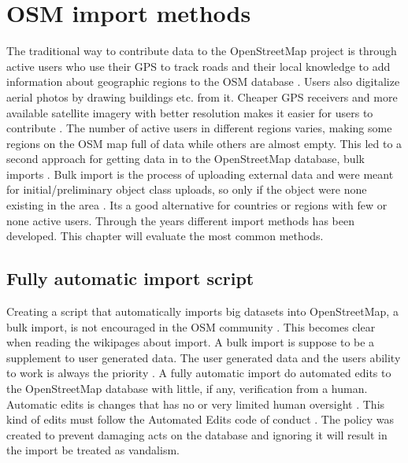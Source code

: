  \chapter{OSM import methods}\label{ch:importmethods}

The traditional way to contribute data to the OpenStreetMap project is through active users who use their GPS to track roads and their local knowledge to add information about geographic regions to the OSM database \cite{Zielstra2013}. Users also digitalize aerial photos by drawing buildings etc. from it. Cheaper GPS receivers and more available satellite imagery with better resolution makes it easier for users to contribute \cite{Chilton}. The number of active users in different regions varies, making some regions on the OSM map full of data while others are almost empty. This led to a second approach for getting data in to the OpenStreetMap database, bulk imports \cite{Zielstra2013}.  Bulk import is the process of uploading external data and were meant for initial/preliminary object class uploads, so only if the object were none existing in the area  \cite{Zielstra2013}.  Its a good alternative for countries or regions with few or none active users. Through the years different import methods has been developed. This chapter will evaluate the most common methods. 

\section{Fully automatic import script}
Creating a script that automatically imports big datasets into OpenStreetMap, a bulk import, is not encouraged in the OSM community \cite{Zielstra2013}. This becomes clear when reading the wikipages about import. A bulk import is suppose to be a supplement to user generated data. The user generated data and the users ability to work is always the priority \cite{OSMimport}. A fully automatic import do automated edits to the OpenStreetMap database with little, if any, verification from a human. Automatic edits is changes that has no or very limited human oversight \cite{OSMAutiEdit}. This kind of edits must follow the Automated Edits code of conduct \cite{OSMAutomaticEdits}. The policy was created to prevent damaging acts on the database and ignoring it will result in the import be treated as vandalism. 

